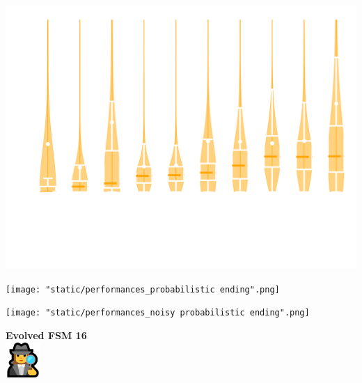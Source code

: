 \documentclass{beamer}
\begin{document}
\begin{frame}
    \begin{center}
        \includegraphics[width=.8\textwidth]{static/performances_noisy.png}
    \end{center}
\end{frame}

\begin{frame}
    \begin{center}
        \texttt{[image: "static/performances\_probabilistic ending".png]}
    \end{center}
\end{frame}

\begin{frame}
    \begin{center}
        \texttt{[image: "static/performances\_noisy probabilistic ending".png]}
    \end{center}
\end{frame}

\begin{frame}
    \begin{center}
    \Large{\textbf{Evolved FSM 16}} \\ \vspace{1cm}
    \includegraphics[width=0.1\textwidth]{static/detective.png}
    \end{center}
\end{frame}
\end{document}
